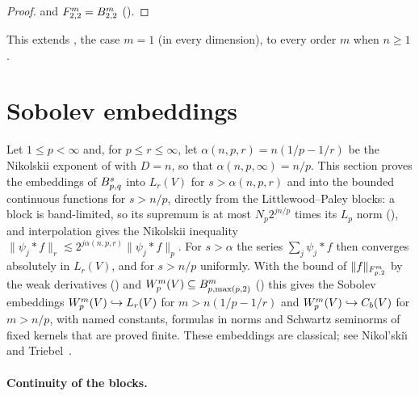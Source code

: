 \begin{proof}
\leanok
{} and $F^{m}_{2,2} = B^{m}_{2,2}$ ().
\end{proof}

This extends , the case $m = 1$ (in every dimension), to every
order $m$ when $n \geq 1$.

\section{Sobolev embeddings}
\label{sec:sobolev-embedding}

Let $1 \leq p < \infty$ and, for $p \leq r \leq \infty$, let
$\alpha(n, p, r) = n (1/p - 1/r)$ be the Nikolskii exponent of 
with $D = n$, so that $\alpha(n, p, \infty) = n/p$. This section proves the embeddings of
$B^{s}_{p,q}$ into $L_r(V)$ for $s > \alpha(n, p, r)$ and into the bounded continuous
functions for $s > n/p$, directly from the Littlewood--Paley blocks: a block is band-limited, so
its supremum is at most $N_p 2^{jn/p}$ times its $L_p$ norm (),
and interpolation gives the Nikolskii inequality
$\|\psi_j * f\|_r \lesssim 2^{j \alpha(n,p,r)} \|\psi_j * f\|_p$. For $s > \alpha$
the series $\sum_j \psi_j * f$ then converges absolutely in $L_r(V)$, and for $s > n/p$ uniformly.
With the bound of $\|f\|_{F^{m}_{p,2}}$ by the weak derivatives
() and $W^{m}_{p}(V) \subseteq B^{m}_{p,\max(p,2)}$
() this gives the Sobolev embeddings
$W^{m}_{p}(V) \hookrightarrow L_r(V)$ for $m > n(1/p - 1/r)$ and
$W^{m}_{p}(V) \hookrightarrow C_b(V)$ for $m > n/p$, with named constants, formulas in norms
and Schwartz seminorms of fixed kernels that are proved finite. These embeddings are classical;
see Nikol'ski\u{\i}~\cite{Nikolskii} and Triebel~\cite{Triebel}.

\paragraph{Continuity of the blocks.}

